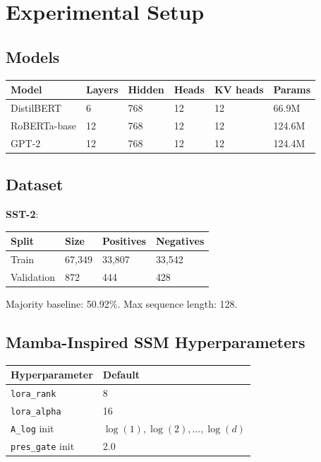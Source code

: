 \section{Experimental Setup}

\subsection{Models}

\begin{table}[H]
\centering
\small
\begin{tabular}{llllll}
\toprule
\textbf{Model} & \textbf{Layers} & \textbf{Hidden} & \textbf{Heads} & \textbf{KV heads} & \textbf{Params} \\
\midrule
DistilBERT & 6 & 768 & 12 & 12 & 66.9M \\
RoBERTa-base & 12 & 768 & 12 & 12 & 124.6M \\
GPT-2 & 12 & 768 & 12 & 12 & 124.4M \\
\bottomrule
\end{tabular}
\end{table}

\subsection{Dataset}

\textbf{SST-2}:

\begin{table}[H]
\centering
\small
\begin{tabular}{llll}
\toprule
\textbf{Split} & \textbf{Size} & \textbf{Positives} & \textbf{Negatives} \\
\midrule
Train & 67,349 & 33,807 & 33,542 \\
Validation & 872 & 444 & 428 \\
\bottomrule
\end{tabular}
\end{table}

Majority baseline: 50.92\%. Max sequence length: 128.

\subsection{Mamba-Inspired SSM Hyperparameters}

\begin{table}[H]
\centering
\small
\begin{tabular}{ll}
\toprule
\textbf{Hyperparameter} & \textbf{Default} \\
\midrule
\texttt{lora\_rank} & 8 \\
\texttt{lora\_alpha} & 16 \\
\texttt{A\_log} init & $\log(1), \log(2), \ldots, \log(d)$ \\
\texttt{pres\_gate} init & 2.0 \\
\bottomrule
\end{tabular}
\end{table}

